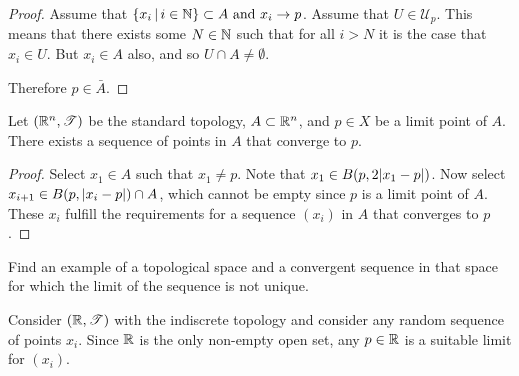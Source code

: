 \documentclass[letterpaper,12pt,fleqn]{article}
\newcommand{\T}{\mathscr{T}}
\newcommand{\U}{\mathcal{U}}
\begin{document}
\begin{proof}
  Assume that \(\left\{{x_i}\,\middle|\,{i\in\mathbb{N}}\right\}\subset A\ \text{and}\ x_i\to p\).  Assume that \(U\in\U_p\).  This means that
  there exists some \(N\in\mathbb{N}\) such that for all \(i>N\) it is the case that \(x_i\in U\).  But \(x_i\in A\) also,
  and so \(U\cap A\ne\emptyset\).

  Therefore \(p\in\bar{A}\).
\end{proof}

\begin{theorem}[2.31]
  Let \((\R^n,\T)\) be the standard topology, \(A\subset\mathbb{R}^n\), and \(p\in X\) be a limit point of \(A\).  There
  exists a sequence of points in \(A\) that converge to \(p\).
\end{theorem}

\begin{proof}
  Select \(x_1\in A\) such that \(x_1\ne p\).  Note that \(x_1\in B(p,2\lvert x_1-p\rvert)\).  Now select \(x_{i+1}\in
  B(p,\lvert x_i-p\rvert)\cap A\), which cannot be empty since \(p\) is a limit point of \(A\).  These \(x_i\) fulfill the
  requirements for a sequence \((x_i)\) in \(A\) that converges to \(p\).
\end{proof}

\begin{example}[Exercise 2.32]
  Find an example of a topological space and a convergent sequence in that space for which the limit of the
  sequence is not unique.

  Consider \((\R,\T)\) with the indiscrete topology and consider any random sequence of points \(x_i\).  Since
  \(\mathbb{R}\) is the only non-empty open set, any \(p\in\mathbb{R}\) is a suitable limit for \((x_i)\).
\end{example}
\end{document}
